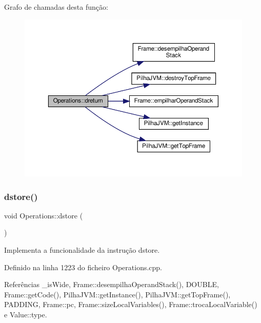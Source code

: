 Grafo de chamadas desta função\+:
\nopagebreak
\begin{figure}[H]
\begin{center}
\leavevmode
\includegraphics[width=350pt]{classOperations_a85ce8267820ffcc1e1530d533545c9f3_cgraph}
\end{center}
\end{figure}
\mbox{\label{classOperations_a83fb57afed30b1223f8485492f9d9958}} 
\subsubsection{\texorpdfstring{dstore()}{dstore()}}
{\footnotesize\ttfamily void Operations\+::dstore (\begin{DoxyParamCaption}{ }\end{DoxyParamCaption})\hspace{0.3cm}{\ttfamily [private]}}



Implementa a funcionalidade da instrução dstore. 



Definido na linha 1223 do ficheiro Operations.\+cpp.



Referências \+\_\+is\+Wide, Frame\+::desempilha\+Operand\+Stack(), D\+O\+U\+B\+LE, Frame\+::get\+Code(), Pilha\+J\+V\+M\+::get\+Instance(), Pilha\+J\+V\+M\+::get\+Top\+Frame(), P\+A\+D\+D\+I\+NG, Frame\+::pc, Frame\+::size\+Local\+Variables(), Frame\+::troca\+Local\+Variable() e Value\+::type.



